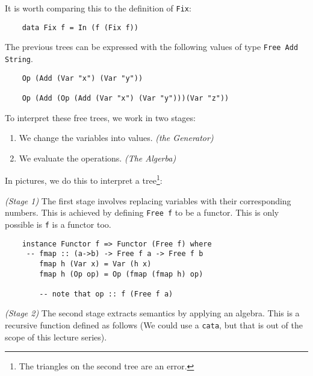\documentclass[a4paper,12pt]{article}
\theoremstyle{remark}
\begin{document}
It is worth comparing this to the definition of \lstinline{Fix}:

\begin{lstlisting}
    data Fix f = In (f (Fix f))  \end{lstlisting}

The previous trees can be expressed with the following values of type \lstinline{Free Add String}.

\begin{lstlisting}
    Op (Add (Var "x") (Var "y"))

    Op (Add (Op (Add (Var "x") (Var "y")))(Var "z"))  \end{lstlisting}

To interpret these free trees, we work in two stages:

\begin{enumerate}
  \item We change the variables into values. \textit{(the Generator)}
  \item We evaluate the operations. \textit{(The Algerba)}
\end{enumerate}

In pictures, we do this to interpret a tree\footnote{The triangles on the second tree are an error.}:

\begin{figure}[H]
  \centering
\end{figure}

\textit{(Stage 1)} The first stage involves replacing variables with their corresponding numbers. This
is achieved by defining \lstinline{Free f} to be a functor. This is only possible is \lstinline{f} is a
functor too.

\begin{lstlisting}
    instance Functor f => Functor (Free f) where
     -- fmap :: (a->b) -> Free f a -> Free f b
        fmap h (Var x) = Var (h x)
        fmap h (Op op) = Op (fmap (fmap h) op)

        -- note that op :: f (Free f a)  \end{lstlisting}

\begin{figure}[H]
  \centering
\end{figure}

\textit{(Stage 2)} The second stage extracts semantics by applying an algebra. This is a recursive function
defined as follows (We could use a \lstinline{cata}, but that is out of the scope of this lecture series).
\end{document}
